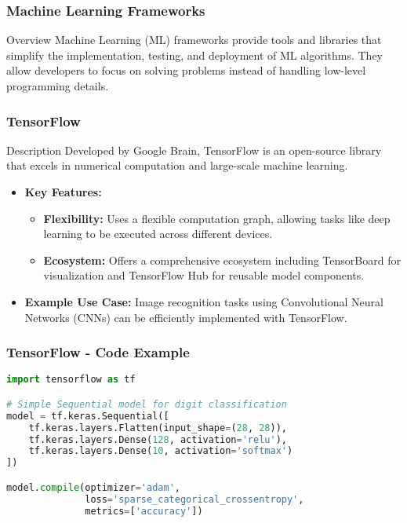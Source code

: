 \documentclass[aspectratio=169]{beamer}
\begin{document}
\begin{frame}[fragile]
    \frametitle{Machine Learning Frameworks}
    \begin{block}{Overview}
        Machine Learning (ML) frameworks provide tools and libraries that simplify the implementation, testing, and deployment of ML algorithms. They allow developers to focus on solving problems instead of handling low-level programming details.
    \end{block}
\end{frame}

\begin{frame}[fragile]
    \frametitle{TensorFlow}
    \begin{block}{Description}
        Developed by Google Brain, TensorFlow is an open-source library that excels in numerical computation and large-scale machine learning.
    \end{block}

    \begin{itemize}
        \item \textbf{Key Features:}
        \begin{itemize}
            \item \textbf{Flexibility:} Uses a flexible computation graph, allowing tasks like deep learning to be executed across different devices.
            \item \textbf{Ecosystem:} Offers a comprehensive ecosystem including TensorBoard for visualization and TensorFlow Hub for reusable model components.
        \end{itemize}
        \item \textbf{Example Use Case:} 
        Image recognition tasks using Convolutional Neural Networks (CNNs) can be efficiently implemented with TensorFlow.
    \end{itemize}
\end{frame}

\begin{frame}[fragile]
    \frametitle{TensorFlow - Code Example}
    \begin{lstlisting}[language=Python]
import tensorflow as tf

# Simple Sequential model for digit classification
model = tf.keras.Sequential([
    tf.keras.layers.Flatten(input_shape=(28, 28)),
    tf.keras.layers.Dense(128, activation='relu'),
    tf.keras.layers.Dense(10, activation='softmax')
])

model.compile(optimizer='adam', 
              loss='sparse_categorical_crossentropy', 
              metrics=['accuracy'])
    \end{lstlisting}
\end{frame}
\end{document}
